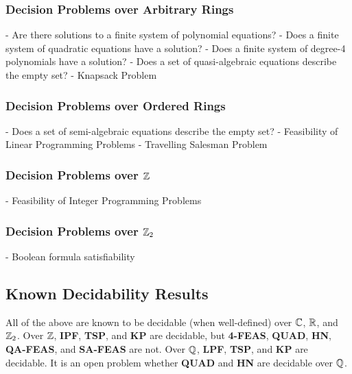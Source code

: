 \documentclass[twoside]{article}
\begin{document}
  \begin{itemize}
    \subsubsection{Decision Problems over Arbitrary Rings}
     - Are there solutions to a finite system of polynomial equations?
     - Does a finite system of quadratic equations have a solution?
     - Does a finite system of degree-4 polynomials have a solution?
     - Does a set of quasi-algebraic equations describe the empty set?  
     - Knapsack Problem
    
    \subsubsection{Decision Problems over Ordered Rings}
     - Does a set of semi-algebraic equations describe the empty set?
     - Feasibility of Linear Programming Problems
     - Travelling Salesman Problem
    
    \subsubsection{Decision Problems over $\mathbb{Z}$}
     - Feasibility of Integer Programming Problems

    \subsubsection{Decision Problems over $\mathbb{Z}_2$}
     - Boolean formula satisfiability
  \end{itemize}

  \subsection{Known Decidability Results}

  All of the above are known to be decidable (when well-defined) over
  $\mathbb{C}$, $\mathbb{R}$, and $\mathbb{Z}_2$.  Over $\mathbb{Z}$,
  \textbf{IPF}, \textbf{TSP}, and \textbf{KP} are decidable, but
  \textbf{4-FEAS}, \textbf{QUAD}, \textbf{HN}, \textbf{QA-FEAS}, and
  \textbf{SA-FEAS} are not.  Over $\mathbb{Q}$, \textbf{LPF},
  \textbf{TSP}, and \textbf{KP} are decidable.  It is an open problem
  whether \textbf{QUAD} and \textbf{HN} are decidable over $\mathbb{Q}$.
\end{document}

